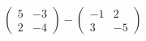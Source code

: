 \hspace*{2mm}\begin{minipage}[t]{\dimexpr\linewidth-2mm\relax}\vspace{0pt}
$\begin{pmatrix} 5 & -3 \\ 2 & -4 \end{pmatrix}-\begin{pmatrix} -1 & 2 \\ 3 & -5 \end{pmatrix}$\end{minipage}
